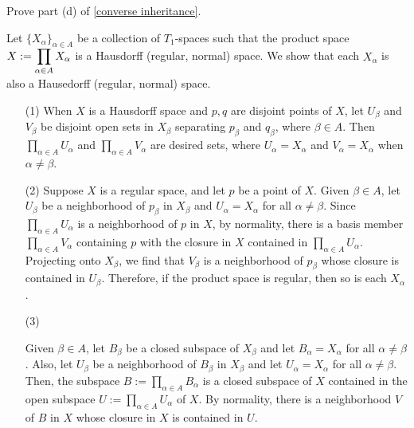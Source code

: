 \begin{prob}
    Prove part (d) of \cref{converse inheritance}.
\end{prob}
\begin{sol}
    Let $\{X_\alpha\}_{\alpha\in A}$ be a collection of $T_1$-spaces such that the product space $\displaystyle{X:=\prod_{\alpha\in A} X_\alpha}$ is a Hausdorff (regular, normal) space.
    We show that each $X_\alpha$ is also a Hausedorff (regular, normal) space.
    \begin{enumerate}
        \item[(1)]
        {
            When $X$ is a Hausdorff space and $p, q$ are disjoint points of $X$, let $U_\beta$ and $V_\beta$ be disjoint open sets in $X_\beta$ separating $p_\beta$ and $q_\beta$, where $\beta\in A$.
            Then $\prod_{\alpha\in A} U_\alpha$ and $\prod_{\alpha\in A} V_\alpha$ are desired sets, where $U_\alpha=X_\alpha$ and $V_\alpha=X_\alpha$ when $\alpha\neq\beta$.
        }
        \item[(2)]
        {
            Suppose $X$ is a regular space, and let $p$ be a point of $X$.
            Given $\beta\in A$, let $U_\beta$ be a neighborhood of $p_\beta$ in $X_\beta$ and $U_\alpha=X_\alpha$ for all $\alpha\neq\beta$.
            Since $\prod_{\alpha\in A}U_\alpha$ is a neighborhood of $p$ in $X$, by normality, there is a basis member $\prod_{\alpha\in A}V_\alpha$ containing $p$ with the closure in $X$ contained in $\prod_{\alpha\in A}U_\alpha$.
            Projecting onto $X_\beta$, we find that $V_\beta$ is a neighborhood of $p_\beta$ whose closure is contained in $U_\beta$.
            Therefore, if the product space is regular, then so is each $X_\alpha$.
        }
        \item[(3)]
        {
            Given $\beta\in A$, let $B_\beta$ be a closed subspace of $X_\beta$ and let $B_\alpha=X_\alpha$ for all $\alpha\neq\beta$.
            Also, let $U_\beta$ be a neighborhood of $B_\beta$ in $X_\beta$ and let $U_\alpha=X_\alpha$ for all $\alpha\neq\beta$.
            Then, the subspace $B:=\prod_{\alpha\in A}B_\alpha$ is a closed subspace of $X$ contained in the open subspace $U:=\prod_{\alpha\in A} U_\alpha$ of $X$.
            By normality, there is a neighborhood $V$ of $B$ in $X$ whose closure in $X$ is contained in $U$.

}
\end{enumerate}
\end{sol}
